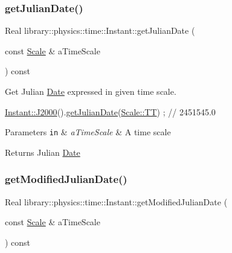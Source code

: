 \subsubsection{\texorpdfstring{get\+Julian\+Date()}{getJulianDate()}}
{\footnotesize\ttfamily Real library\+::physics\+::time\+::\+Instant\+::get\+Julian\+Date (\begin{DoxyParamCaption}\item[{const \hyperlink{namespacelibrary_1_1physics_1_1time_a09d2bc9fbc7b0b5f92e1419bd655e6bb}{Scale} \&}]{a\+Time\+Scale }\end{DoxyParamCaption}) const}



Get Julian \hyperlink{classlibrary_1_1physics_1_1time_1_1_date}{Date} expressed in given time scale. 


\begin{DoxyCode}
\hyperlink{classlibrary_1_1physics_1_1time_1_1_instant_a2a4f57aa71693b8def06788d55bc3bd3}{Instant::J2000}().\hyperlink{classlibrary_1_1physics_1_1time_1_1_instant_a592844ceab80e29ab65766aedc194acb}{getJulianDate}(\hyperlink{namespacelibrary_1_1physics_1_1time_a09d2bc9fbc7b0b5f92e1419bd655e6bbadf1f3edb9115acb0a1e04209b7a9937b}{Scale::TT}) ; \textcolor{comment}{// 2451545.0}
\end{DoxyCode}



\begin{DoxyParams}[1]{Parameters}
\mbox{\tt in}  & {\em a\+Time\+Scale} & A time scale \\
\hline
\end{DoxyParams}
\begin{DoxyReturn}{Returns}
Julian \hyperlink{classlibrary_1_1physics_1_1time_1_1_date}{Date} 
\end{DoxyReturn}
\mbox{\label{classlibrary_1_1physics_1_1time_1_1_instant_a01a167d6aee17d47ff200b2472199382}} 
\subsubsection{\texorpdfstring{get\+Modified\+Julian\+Date()}{getModifiedJulianDate()}}
{\footnotesize\ttfamily Real library\+::physics\+::time\+::\+Instant\+::get\+Modified\+Julian\+Date (\begin{DoxyParamCaption}\item[{const \hyperlink{namespacelibrary_1_1physics_1_1time_a09d2bc9fbc7b0b5f92e1419bd655e6bb}{Scale} \&}]{a\+Time\+Scale }\end{DoxyParamCaption}) const}



